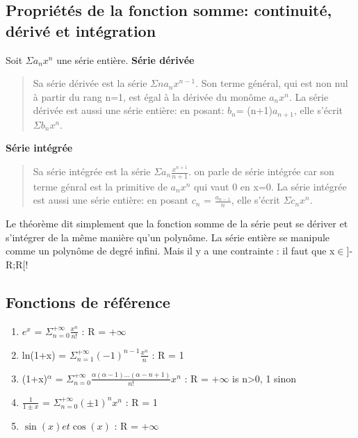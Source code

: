 \documentclass{article}
\begin{document}
\subsection{Propriétés de la fonction somme: continuité, dérivé et intégration}
Soit $\Sigma a_{n}x^{n}$ une série entière.\newline
\textbf{Série dérivée}
\begin{quote}
    Sa série dérivée est la série $\Sigma n a_{n}x^{n-1}$. Son terme général, qui est non nul à partir du rang n=1, est égal à la dérivée du monôme $a_{n}x^{n}$.\newline
    La série dérivée est aussi une série entière: en posant: $b_{n}$= (n+1)$a_{n+1}$, elle s'écrit $\Sigma b_{n}x^{n}$.
\end{quote}

\noindent \textbf{Série intégrée}
\begin{quote}
    Sa série intégrée est la série $\Sigma a_{n}\frac{x^{n+1}}{n+1}$. on parle de série intégrée car son terme génral est la primitive de $a_{n}x^{n}$ qui vaut 0 en x=0.\newline
    La série intégrée est aussi une série entière: en posant $c_{n}$ = $\frac{a_{n-1}}{n}$, elle s'écrit $\Sigma c_{n}x^{n}$.
\end{quote}

\noindent Le théorème dit simplement que la fonction somme de la série peut se dériver et s'intégrer de la même manière qu'un polynôme. La série entière se manipule comme un polynôme de degré infini. Mais il y a une contrainte : il faut que x$\in$]-R;R[!

\subsection{Fonctions de référence}
\begin{enumerate}
    \item $e^{x}$ = $\Sigma_{n=0}^{+\infty} \frac{x^{n}}{n!}$ : R = +$\infty$
    \item ln(1+x) = $\Sigma_{n=1}^{+\infty} (-1)^{n-1} \frac{x^{n}}{n}$ : R = 1
    \item (1+x)$^{\alpha}$ = $\Sigma_{n=0}^{+\infty} \frac{\alpha(\alpha-1)...(\alpha-n+1)}{n!} x^{n}$ : R = +$\infty$ is n>0, 1 sinon
    \item $\frac{1}{1\pm x}$ = $\Sigma_{n=0}^{+\infty} (\pm 1)^{n} x^{n}$ : R = 1
    \item $\sin(x) et \cos(x)$ : R = +$\infty$
\end{enumerate}
\end{document}
